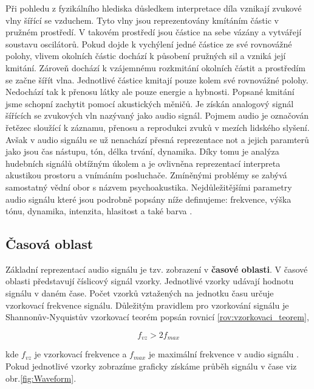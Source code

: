   Při pohledu z fyzikálního hlediska důsledkem interpretace díla vznikají zvukové vlny šířící se vzduchem.
  Tyto vlny jsou reprezentovány kmítáním částic v pružném prostředí. V takovém prostředí jsou částice na sebe vázány a vytvářejí soustavu oscilátorů. Pokud dojde k vychýlení jedné částice ze své rovnovážné polohy,
  vlivem okolních částic dochází k působení pružných sil a vzniká její kmitání. 
  Zároveň dochází k vzájemnému rozkmitání okolních částit a prostředím se začne šířít vlna. Jednotlivé částice kmitají pouze kolem své rovnovážné polohy. Nedochází tak k přenosu látky ale pouze energie a hybnosti\cite{crocker1998handbook}.
  Popsané kmitání jsme schopní zachytit pomocí akustických měničů.
  Je získán analogový signál šířících se zvukových vln nazývaný jako audio signál.
  Pojmem audio je označován řetězec sloužící k záznamu, přenosu a reprodukci zvuků v mezích lidského slyšení.
  Avšak v audio signálu se už nenachází přesná reprezentace not a jejich paramterů jako jsou čas nástupu, tón, délka trvání, dynamika.
  Díky tomu je analýza hudebních signálů obtížným úkolem a je ovlivněna reprezentací interpreta akustikou prostoru a vnímáním posluchače.
  Zmíněnými problémy se zabývá samostatný vědní obor s názvem psychoakustika.
  Nejdůležitějšími parametry audio signálu které jsou podrobně popsány níže definujeme: frekvence, výška tónu, dynamika, intenzita, hlasitost a také barva \cite{fundamental_of_music_processing}.

  \subsection{Časová oblast}
  Základní reprezentací audio signálu je tzv. zobrazení v \textbf{časové oblasti}.
  V časové oblasti představují číslicový signál vzorky. Jednotlivé vzorky udávají hodnotu signálu v daném čase.
  Počet vzorků vztažených na jednotku času určuje vzorkovací frekvence signálu.
  Důležitým pravidlem pro vzorkování signálu je Shannonův-Nyquistův vzorkovací teorém popsán rovnicí \ref{rov:vzorkovaci_teorem},

  \begin{equation}
    f_{vz} > 2f_{max}
    \label{rov:vzorkovaci_teorem}
  \end{equation}

  kde $f_{vz}$ je vzorkovací frekvence a $f_{max}$ je maximální frekvence v audio signálu \cite{bracewell1978fourier}.  
  Pokud jednotlivé vzorky zobrazíme graficky získáme průběh signálu v čase viz obr.\ref{fig:Waveform}.

